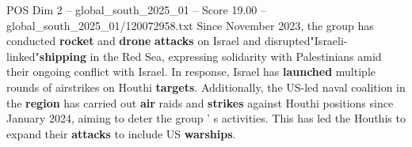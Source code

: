 \begin{textsample}{POS Dim 2 – global\_south\_2025\_01 – Score 19.00 – global\_south\_2025\_01/120072958.txt}
Since November 2023, the group has conducted \textbf{rocket} and \textbf{drone} \textbf{attacks} on Israel and disrupted"Israeli-linked"\textbf{shipping} in the Red Sea, expressing solidarity with Palestinians amid their ongoing conflict with Israel.
In response, Israel has \textbf{launched} multiple rounds of airstrikes on Houthi \textbf{targets}.
Additionally, the US-led naval coalition in the \textbf{region} has carried out \textbf{air} raids and \textbf{strikes} against Houthi positions since January 2024, aiming to deter the group ' s activities.
This has led the Houthis to expand their \textbf{attacks} to include US \textbf{warships}.

\end{textsample}
